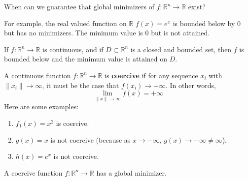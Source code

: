 \begin{problem}[Motivation]
  When can we guarantee that global minimizers of $f: \mathbb R^n \rightarrow \mathbb R$ exist?

  For example, the real valued function on $\mathbb R$ $f(x) = e^x$ is bounded below by 0 but has no minimizers. The minimum value is 0 but is not attained.
\end{problem}
\begin{proposition}
  If $f: \mathbb R^n \rightarrow \mathbb R$ is continuous, and if $D \subset \mathbb R^n$ is a closed and bounded set, then $f$ is bounded below and the minimum value is attained on $D$.
\end{proposition}
\begin{definition}
  A continuous function $f: \mathbb R^n \rightarrow \mathbb R$ is \textbf{coercive} if for any sequence $x_i$ with $\|x_i \| \rightarrow \infty$, it must be the case that $f(x_i) \rightarrow +\infty$. In other words, $$\lim_{\|x\| \rightarrow \infty} f(x) = +\infty$$
  Here are some examples:
  \begin{enumerate}
    \item $f_1(x) = x^2$ is coercive.
    \item $g(x) = x$ is not coercive (because as $x \rightarrow -\infty$, $g(x) \rightarrow -\infty \neq \infty$).
    \item $h(x) = e^x$ is not coercive.
  \end{enumerate}
\end{definition}
\begin{proposition}
  A coercive function $f: \mathbb R^n \rightarrow \mathbb R$ has a global minimizer.
\end{proposition}